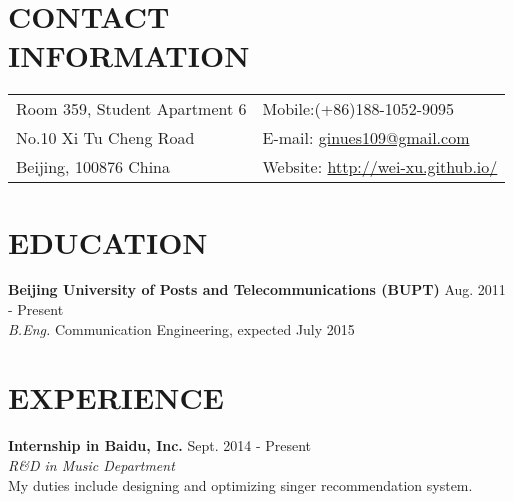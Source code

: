 \documentclass[margin,10pt]{res} %
\begin{document}
\begin{resume}

\section{CONTACT \\ INFORMATION}
\begin{tabular}{ll}
\leftmargini=4mm
Room 359, Student Apartment 6& Mobile:(+86)188-1052-9095\\
No.10 Xi Tu Cheng Road & E-mail: \href{mailto:ginues109@gmail.com}{ginues109@gmail.com}\\
Beijing, 100876 China & Website: \url{http://wei-xu.github.io/}
\end{tabular}





\section{EDUCATION}

{\bf Beijing University of Posts and Telecommunications (BUPT)} \hfill Aug. 2011 - Present\\
{\sl B.Eng.} Communication Engineering, expected July 2015


\section{EXPERIENCE}
\leftmargini=4mm
{\bf Internship in Baidu, Inc.} \hfill Sept. 2014 - Present \\
\textit{R\&D in Music Department}\\
My duties include designing and optimizing singer recommendation system.


\end{resume}
\end{document}
